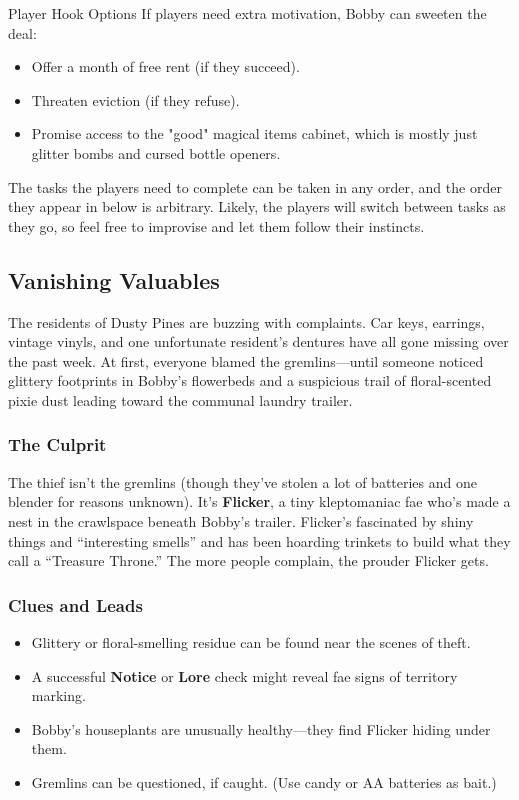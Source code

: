 \begin{CommentBox}{Player Hook Options}
    If players need extra motivation, Bobby can sweeten the deal:
    \begin{itemize}
        \item Offer a month of free rent (if they succeed).
        \item Threaten eviction (if they refuse).
        \item Promise access to the "good" magical items cabinet, which is mostly just glitter bombs and cursed bottle openers.
    \end{itemize}
\end{CommentBox}

The tasks the players need to complete can be taken in any order, and the order they appear in below is arbitrary. Likely, the players will switch between tasks as they go, so feel free to improvise and let them follow their instincts.

\subsection{Vanishing Valuables}

The residents of Dusty Pines are buzzing with complaints. Car keys, earrings, vintage vinyls, and one unfortunate resident’s dentures have all gone missing over the past week. At first, everyone blamed the gremlins—until someone noticed glittery footprints in Bobby’s flowerbeds and a suspicious trail of floral-scented pixie dust leading toward the communal laundry trailer.




\subsubsection{The Culprit}
The thief isn’t the gremlins (though they’ve stolen a lot of batteries and one blender for reasons unknown). It’s \textbf{Flicker}, a tiny kleptomaniac fae who’s made a nest in the crawlspace beneath Bobby’s trailer. Flicker’s fascinated by shiny things and “interesting smells” and has been hoarding trinkets to build what they call a “Treasure Throne.” The more people complain, the prouder Flicker gets.


\subsubsection{Clues and Leads}
\begin{itemize}\raggedright
    \item Glittery or floral-smelling residue can be found near the scenes of theft.
    \item A successful \textbf{Notice}  or \textbf{Lore}  check might reveal fae signs of territory marking.
    \item Bobby’s houseplants are unusually healthy—they find Flicker hiding under them.
    \item Gremlins can be questioned, if caught. (Use candy or AA batteries as bait.)
\end{itemize}

